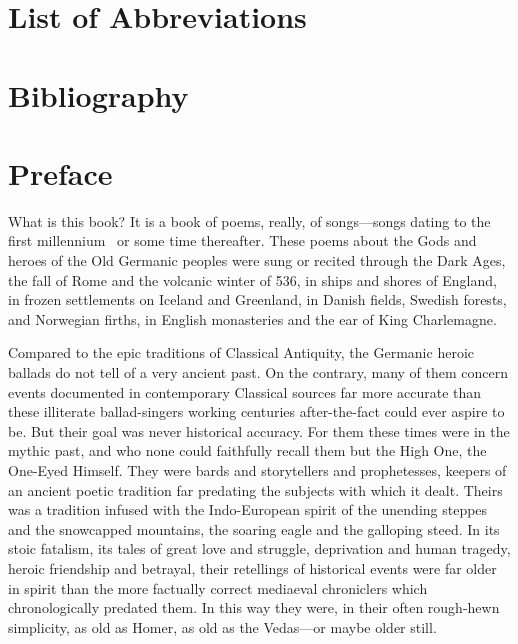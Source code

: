 \section{List of Abbreviations}

\printshorthands[heading=none]

\section{Bibliography}

\printbibliography[heading=none]

\newpage\thispagestyle{empty}

\def\booktitle{List of Figures}%
\listoffigures




\section{Preface}

What is this book?  It is a book of poems, really, of songs---songs dating to the first millennium \ce\ or some time thereafter.  These poems about the Gods and heroes of the Old Germanic peoples were sung or recited through the Dark Ages, the fall of Rome and the volcanic winter of 536, in ships and shores of England, in frozen settlements on Iceland and Greenland, in Danish fields, Swedish forests, and Norwegian firths, in English monasteries and the ear of King Charlemagne.

Compared to the epic traditions of Classical Antiquity, the Germanic heroic ballads do not tell of a very ancient past.  On the contrary, many of them concern events documented in contemporary Classical sources far more accurate than these illiterate ballad-singers working centuries after-the-fact could ever aspire to be.  But their goal was never historical accuracy.  For them these times were in the mythic past, and who none could faithfully recall them but the High One, the One-Eyed Himself.  They were bards and storytellers and prophetesses, keepers of an ancient poetic tradition far predating the subjects with which it dealt.  Theirs was a tradition infused with the Indo-European spirit of the unending steppes and the snowcapped mountains, the soaring eagle and the galloping steed.  In its stoic fatalism, its tales of great love and struggle, deprivation and human tragedy, heroic friendship and betrayal, their retellings of historical events were far older in spirit than the more factually correct mediaeval chroniclers which chronologically predated them.  In this way they were, in their often rough-hewn simplicity, as old as Homer, as old as the Vedas---or maybe older still.


